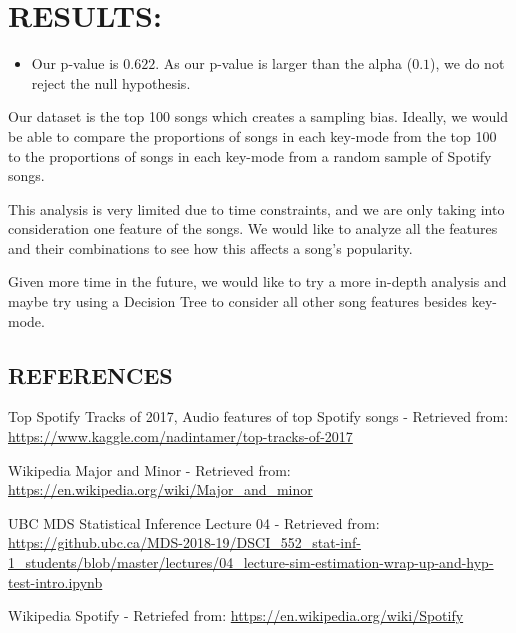\documentclass[]{article}
\providecommand{\tightlist}{%
  \setlength{\itemsep}{0pt}\setlength{\parskip}{0pt}}
\begin{document}
\section{RESULTS:}\label{results}

\begin{itemize}
\tightlist
\item
  Our p-value is \textbf{$0.622$}. As our p-value is larger than the
  alpha (\textbf{$0.1$}), we do not reject the null hypothesis.
\end{itemize}

Our dataset is the top 100 songs which creates a sampling bias. Ideally,
we would be able to compare the proportions of songs in each key-mode
from the top 100 to the proportions of songs in each key-mode from a
random sample of Spotify songs.

This analysis is very limited due to time constraints, and we are only
taking into consideration one feature of the songs. We would like to
analyze all the features and their combinations to see how this affects
a song's popularity.

Given more time in the future, we would like to try a more in-depth
analysis and maybe try using a Decision Tree to consider all other song
features besides key-mode.

\subsection{REFERENCES}\label{references}

Top Spotify Tracks of 2017, Audio features of top Spotify songs -
Retrieved from:
\url{https://www.kaggle.com/nadintamer/top-tracks-of-2017}

Wikipedia Major and Minor - Retrieved from:
\url{https://en.wikipedia.org/wiki/Major_and_minor}

UBC MDS Statistical Inference Lecture 04 - Retrieved from:
\url{https://github.ubc.ca/MDS-2018-19/DSCI_552_stat-inf-1_students/blob/master/lectures/04_lecture-sim-estimation-wrap-up-and-hyp-test-intro.ipynb}

Wikipedia Spotify - Retriefed from:
\url{https://en.wikipedia.org/wiki/Spotify}
\end{document}
